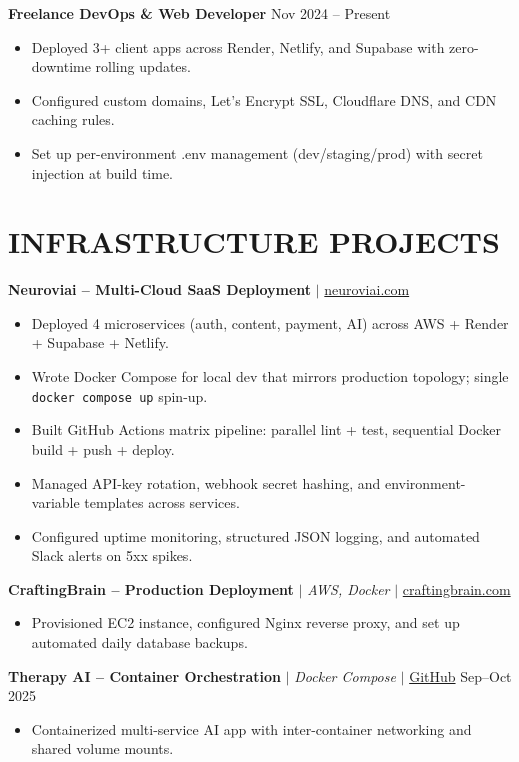 \documentclass[10pt]{article}
\begin{document}
\textbf{Freelance DevOps \& Web Developer} \hfill Nov 2024 -- Present
\begin{itemize}
\item Deployed 3+ client apps across Render, Netlify, and Supabase with zero-downtime rolling updates.
\item Configured custom domains, Let's Encrypt SSL, Cloudflare DNS, and CDN caching rules.
\item Set up per-environment .env management (dev/staging/prod) with secret injection at build time.
\end{itemize}

\section*{INFRASTRUCTURE PROJECTS}
\textbf{Neuroviai -- Multi-Cloud SaaS Deployment} $|$ \href{https://neuroviai.com}{neuroviai.com}
\begin{itemize}
\item Deployed 4 microservices (auth, content, payment, AI) across AWS + Render + Supabase + Netlify.
\item Wrote Docker Compose for local dev that mirrors production topology; single \texttt{docker compose up} spin-up.
\item Built GitHub Actions matrix pipeline: parallel lint + test, sequential Docker build + push + deploy.
\item Managed API-key rotation, webhook secret hashing, and environment-variable templates across services.
\item Configured uptime monitoring, structured JSON logging, and automated Slack alerts on 5xx spikes.
\end{itemize}

\textbf{CraftingBrain -- Production Deployment} $|$ \textit{AWS, Docker} $|$ \href{https://craftingbrain.com}{craftingbrain.com}
\begin{itemize}
\item Provisioned EC2 instance, configured Nginx reverse proxy, and set up automated daily database backups.
\end{itemize}

\textbf{Therapy AI -- Container Orchestration} $|$ \textit{Docker Compose} $|$ \href{https://github.com/JeetInTech/Virtual-Therapist---LangGraph-Agentic-AI-System}{GitHub} \hfill Sep--Oct 2025
\begin{itemize}
\item Containerized multi-service AI app with inter-container networking and shared volume mounts.
\end{itemize}
\end{document}
